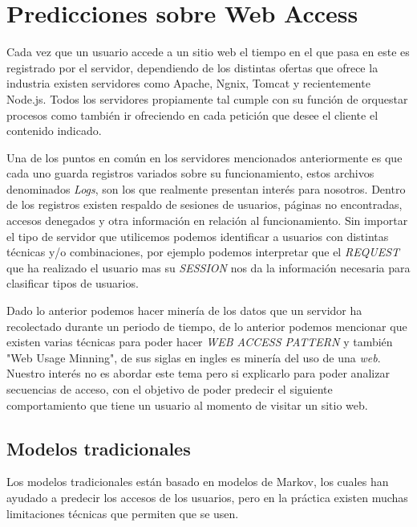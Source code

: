 \chapter[Predicciones sobre Web Access]{Predicciones sobre Web Access}
\label{ch:tema}


Cada vez que un usuario accede a un sitio web el tiempo en el que pasa en este es registrado
por el servidor, dependiendo de los distintas ofertas que ofrece la industria existen servidores como Apache, Ngnix, Tomcat
y recientemente Node.js. Todos los servidores propiamente tal cumple con su función de orquestar procesos
como también ir ofreciendo en cada petición que desee el cliente el contenido indicado.



Una de los puntos en común en los servidores mencionados anteriormente es que cada uno guarda registros variados sobre su funcionamiento,
estos archivos denominados \emph{Logs}, son los que realmente presentan interés para nosotros. Dentro de los registros existen respaldo de sesiones de usuarios, páginas no encontradas, accesos denegados y otra información en relación al funcionamiento. Sin importar el tipo de servidor que utilicemos podemos identificar a usuarios con distintas técnicas y/o combinaciones, por ejemplo podemos interpretar que el \emph{REQUEST} que ha realizado el usuario mas su \emph{SESSION} nos da la información necesaria para clasificar tipos de usuarios.

Dado lo anterior podemos hacer minería de los datos que un servidor ha recolectado durante un periodo de tiempo, de lo anterior  podemos mencionar que existen varias
técnicas para poder hacer \emph{WEB ACCESS PATTERN } y también  "Web Usage Minning", de sus siglas en ingles es minería del uso de una \emph{web}. Nuestro interés no es abordar este tema pero si explicarlo para poder analizar secuencias de acceso, con el objetivo de poder predecir el siguiente comportamiento que tiene un usuario al momento de visitar un sitio web.





\section{Modelos tradicionales}
 
Los modelos tradicionales están basado en modelos de Markov, los cuales han ayudado a predecir los accesos de los usuarios, pero en la práctica existen 
muchas limitaciones técnicas que permiten que se usen. 

